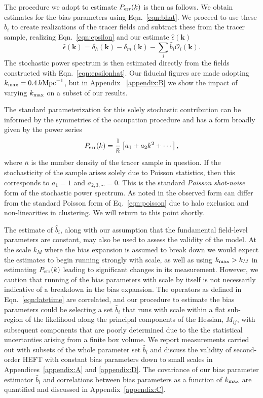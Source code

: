 \documentclass[fleqn,usenatbib]{mnras}
\newcommand{\bk}{\textbf{k}}
\newcommand{\ihmpc}{\,h{\rm Mpc}^{-1}}
\newcommand{\kmax}{k_{\rm max}}
\begin{document}
The procedure we adopt to estimate $P_{\rm err}(k)$ is then as follows.  We obtain estimates for the bias parameters using Eqn.~\ref{eqn:bhat}. We proceed to use these $\hat{b}_i $ to create realizations of the tracer fields and subtract these from the tracer sample, realizing Eqn.~\ref{eqn:epsilon} and our estimate $\hat{\epsilon}(\bk)$
\begin{equation}
\label{eqn:epsilonhat}
    \hat{\epsilon} (\bk) = \delta_h (\bk) - \delta_m (\bk) - \sum_i \hat{b}_i  \mathcal{O}_i (\bk).
\end{equation}
The stochastic power spectrum is then estimated directly from the fields constructed with Eqn.~\ref{eqn:epsilonhat}. Our fiducial figures are made adopting $k_{\rm max} = 0.4 \ihmpc$, but in Appendix ~\ref{appendix:B} we show the impact of varying $k_{\rm max}$ on a subset of our results.  \par 
The standard parameterization for this solely stochastic contribution can be informed by the symmetries of the occupation procedure and has a form broadly given by the power series \citep{Desjacques:2016bnm, Cabass_2020}
\begin{equation}
\label{eqn:poisson}
    P_{\rm err} (k) = \frac{1}{\bar{n}} \left [ a_1 + a_2 k^2 + \cdots \right],
\end{equation}
where $\bar{n}$ is the number density of the tracer sample in question. If the stochasticity of the sample arises solely due to Poisson statistics, then this corresponds to $a_1 = 1$ and $a_{2,3,\cdots} = 0$. This is the standard \emph{Poisson shot-noise} form of the stochastic power spectrum. As noted in \cite{Baldauf_2013} the observed form can differ from the standard Poisson form of Eq.~\ref{eqn:poisson} due to halo exclusion and non-linearities in clustering. We will return to this point shortly.\par 
The estimate of $\hat{b}_i$, along with our assumption that the fundamental field-level parameters are constant, may also be used to assess the validity of the model. At the scale $k_M$ where the bias expansion is assumed to break down we would expect the estimates to begin running strongly with scale, as well as using $k_{\rm max} > k_M$ in estimating $P_{\rm err}(k)$ leading to significant changes in its measurement. However, we caution that running of the bias parameters with scale by itself is not necessarily indicative of a breakdown in the bias expansion. The operators as defined in Eqn.~\ref{eqn:latetime} are correlated, and our procedure to estimate the bias parameters could be selecting a set $\hat{b}_i$ that runs with scale within a flat sub-region of the likelihood along the principal components of the Hessian, $M_{ij}$, with subsequent components that are poorly determined due to the the statistical uncertanties arising from a finite box volume. We report measurements carried out with subsets of the whole parameter set $\hat{b}_i$ and discuss the validity of second-order HEFT with constant bias parameters down to small scales in Appendices~\ref{appendix:A} and \ref{appendix:D}. The covariance of our bias parameter estimator $\hat{b}_i$ and correlations between bias parameters as a function of $\kmax$ are quantified and discussed in Appendix~\ref{appendix:C}.
\end{document}
